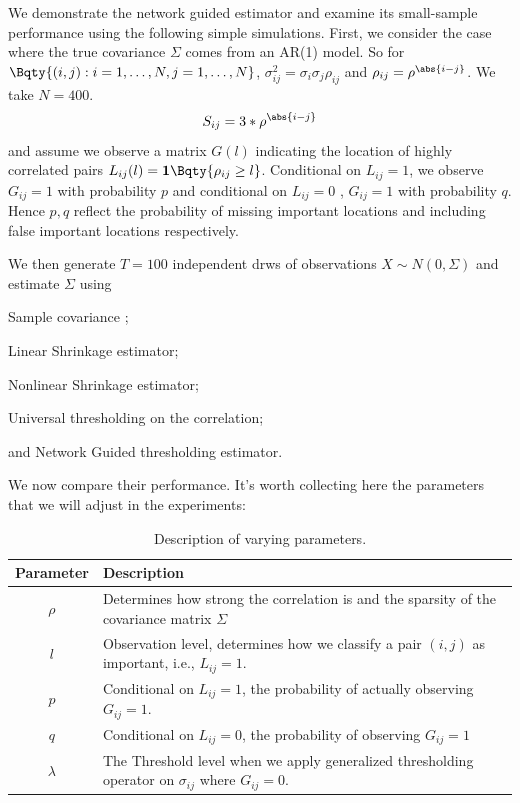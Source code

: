 We demonstrate the network guided estimator and examine its small-sample performance using the following simple simulations. First, we consider the case where the true covariance \(\Sigma\) comes from an AR(1) model. So for \(\Bqty{(i,j): i =1 ,\dots, N, j = 1,\dots,N} \), \(\sigma_{ij}^{2} = \sigma_{i}\sigma_{j} \rho_{ij}\) and \(\rho_{ij} = \rho^{\abs{i - j}}\). We take \(N = 400\). 
\begin{equation*}
     S_{ij} = 3 * \rho^{\abs{i - j}}
\end{equation*}
and assume we observe a matrix \(G(l)\) indicating the location of highly correlated pairs \(L_{ij}(l) = \mathbf{1}\Bqty{\rho_{ij} \geq l}\). Conditional on \(L_{ij} = 1\), we observe \(G_{ij}= 1\) with probability \(p\) and conditional on \(L_{ij}  =0\) , \(G_{ij}  =1\) with probability \(q\). Hence \(p,q\) reflect the probability of missing important locations and including false important locations respectively. 

We then generate \(T = 100\) independent drws of observations \(X \sim N(0, \Sigma)\) and estimate \(\Sigma\) using 
\begin{enumerate*}
     \item Sample covariance ;
     \item Linear Shrinkage estimator;
     \item Nonlinear Shrinkage estimator;
     \item Universal thresholding on the correlation;
     \item and Network Guided thresholding estimator. 
\end{enumerate*}
We now compare their performance. It's worth collecting here the parameters that we will adjust in the experiments:
\begin{table}[htbp]
     \centering\begin{tabularx}{\textwidth}{c|X}
          \toprule
          Parameter & Description \\ 
          \midrule
          \(\rho\) & Determines how strong the correlation is and the sparsity of the covariance matrix \(\Sigma\) \\
          \(l\) & Observation level, determines how we classify a pair \((i,j)\) as important, i.e., \(L_{ij} =1\). \\
          \(p\) & Conditional on \(L_{ij} =1\), the probability of actually observing \(G_{ij} =1\). \\
          \(q\) & Conditional on \(L_{ij} = 0\), the probability of  observing \(G_{ij} =1\)\\
          \(\lambda\)& The Threshold level when we apply generalized thresholding operator on \(\sigma_{ij}\) where \(G_{ij} = 0\). \\
          \bottomrule
     \end{tabularx}
     \caption{Description of varying parameters.}
     \label{t:1}
\end{table}


